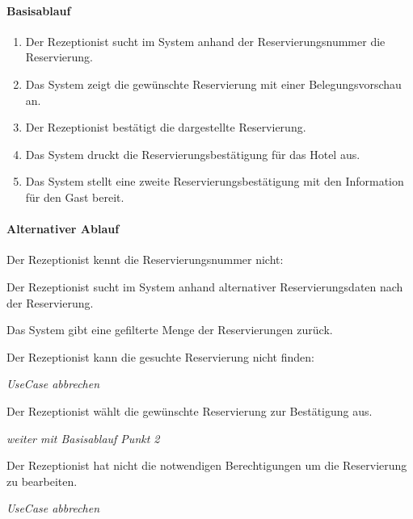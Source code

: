 \paragraph{Basisablauf}
\begin{enumerate}
	\item Der \Gls{Rezeptionist} sucht im System anhand der \Gls{Reservierungsnummer} die \Gls{Reservierung}.
	\item Das System zeigt die gewünschte \Gls{Reservierung} mit einer \Gls{Belegungsvorschau} an.
	\item Der \Gls{Rezeptionist} bestätigt die dargestellte \Gls{Reservierung}.
	\item Das System druckt die Reservierungsbestätigung für das Hotel aus.
	\item Das System stellt eine zweite Reservierungsbestätigung mit den Information für den \Gls{Gast} bereit.
\end{enumerate}

\paragraph{Alternativer Ablauf}
\begin{longenum}
	\item
	\begin{longenum}
		\item Der Rezeptionist kennt die \Gls{Reservierungsnummer} nicht:
		\begin{longenum}
			\item Der \Gls{Rezeptionist} sucht im System anhand alternativer Reservierungsdaten nach der \Gls{Reservierung}.
			\item Das System gibt eine gefilterte Menge der \Gls{Reservierung}en zurück.
			\begin{longenum}
				\item Der \Gls{Rezeptionist} kann die gesuchte \Gls{Reservierung} nicht finden:
				\begin{longenum}
					\item \emph{UseCase abbrechen}
				\end{longenum}
			\end{longenum}
			\item Der \Gls{Rezeptionist} wählt die gewünschte \Gls{Reservierung} zur Bestätigung aus.
			\item \emph{weiter mit Basisablauf Punkt 2}
		\end{longenum}
	\end{longenum}
	\item
	\item
	\begin{longenum}
		\item Der \Gls{Rezeptionist} hat nicht die notwendigen Berechtigungen um die \Gls{Reservierung} zu bearbeiten.
		\begin{longenum}
			\item \emph{UseCase abbrechen}
		\end{longenum}
	\end{longenum}
	\item
	\item
\end{longenum}

